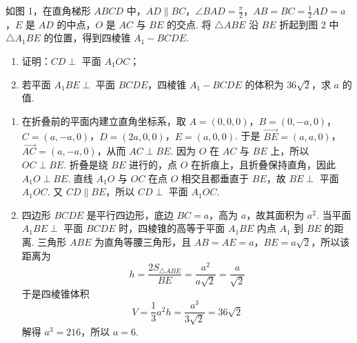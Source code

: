 \begin{problem}
如图 1，在直角梯形 \(ABCD\) 中，\(AD \parallel BC\)，\(\angle BAD = \frac{\pi}{2}\)，\(AB = BC = \frac{1}{2}AD = a\)，\(E\) 是 \(AD\) 的中点，\(O\) 是 \(AC\) 与 \(BE\) 的交点. 将 \(\triangle ABE\) 沿 \(BE\) 折起到图 2 中 \(\triangle A_{1}BE\) 的位置，得到四棱锥 \(A_{1}-BCDE\).

\begin{enumerate}
\item 证明：\(CD \perp\) 平面 \(A_{1}OC\)；
\item 若平面 \(A_{1}BE \perp\) 平面 \(BCDE\)，四棱锥 \(A_{1}-BCDE\) 的体积为 \(36\sqrt{2}\)，求 \(a\) 的值.
\end{enumerate}

 \end{problem}

\begin{solution}
\begin{enumerate}
\item
在折叠前的平面内建立直角坐标系，取
\(A=(0,0,0)\)，\(B=(0,-a,0)\)，\(C=(a,-a,0)\)，\(D=(2a,0,0)\)，\(E=(a,0,0)\).
于是 \(\overrightarrow{BE}=(a,a,0)\)，\(\overrightarrow{AC}=(a,-a,0)\)，从而 \(AC\perp BE\). 因为 \(O\) 在 \(AC\) 与 \(BE\) 上，所以 \(OC\perp BE\). 折叠是绕 \(BE\) 进行的，点 \(O\) 在折痕上，且折叠保持直角，因此 \(A_{1}O\perp BE\). 直线 \(A_{1}O\) 与 \(OC\) 在点 \(O\) 相交且都垂直于 \(BE\)，故 \(BE\perp\) 平面 \(A_{1}OC\). 又 \(CD\parallel BE\)，所以 \(CD\perp\) 平面 \(A_{1}OC\).

\item
四边形 \(BCDE\) 是平行四边形，底边 \(BC=a\)，高为 \(a\)，故其面积为 \(a^2\). 当平面 \(A_{1}BE\perp\) 平面 \(BCDE\) 时，四棱锥的高等于平面 \(A_{1}BE\) 内点 \(A_{1}\) 到 \(BE\) 的距离. 三角形 \(ABE\) 为直角等腰三角形，且 \(AB=AE=a\)，\(BE=a\sqrt{2}\)，所以该距离为
\[
h=\frac{2S_{\triangle ABE}}{BE}=\frac{a^2}{a\sqrt{2}}=\frac{a}{\sqrt{2}}
\]
于是四棱锥体积
\[
V=\frac{1}{3}a^2h=\frac{a^3}{3\sqrt{2}}=36\sqrt{2}
\]
解得 \(a^3=216\)，所以 \(a=6\).
\end{enumerate}
\end{solution}

